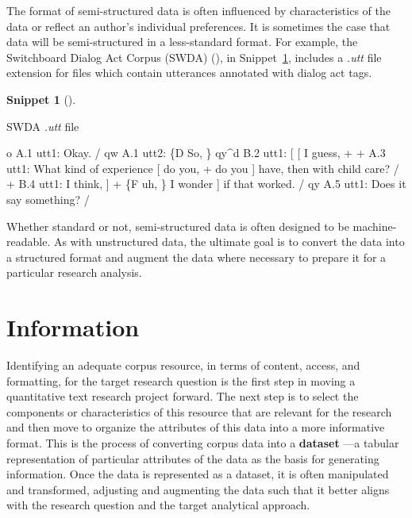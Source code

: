 \documentclass[
  letterpaper,
  krantz1]{latex/krantz-mod}
\newenvironment{Shaded}{\begin{snugshade}}{\end{snugshade}}
\newcommand{\NormalTok}[1]{\textcolor[rgb]{0.00,0.00,0.00}{#1}}
\theoremstyle{definition}
\newtheorem{definition}{Snippet}[chapter]
\theoremstyle{definition}
\theoremstyle{remark}
\begin{document}
The format of semi-structured data is often influenced by
characteristics of the data or reflect an author's individual
preferences. It is sometimes the case that data will be semi-structured
in a less-standard format. For example, the Switchboard Dialog Act
Corpus (SWDA)
(), in
Snippet~\ref{def-swda-utt}, includes a \emph{.utt} file extension for
files which contain utterances annotated with dialog act
tags.

\pagebreak

\begin{definition}[]\protect\hypertarget{def-swda-utt}{}\label{def-swda-utt}

SWDA \emph{.utt} file

\begin{Shaded}
\begin{Highlighting}[]
\NormalTok{o      A.1 utt1: Okay. /}
\NormalTok{qw     A.1 utt2: \{D So, \}}
\NormalTok{qy\^{}d   B.2 utt1: [ [ I guess, +}
\NormalTok{+      A.3 utt1: What kind of experience [ do you, + do you ] have, then with child care? /}
\NormalTok{+      B.4 utt1: I think, ] + \{F uh, \} I wonder ] if that worked. /}
\NormalTok{qy     A.5 utt1: Does it say something? /}
\end{Highlighting}
\end{Shaded}

\end{definition}

Whether standard or not, semi-structured data is often designed to be
machine-readable. As with unstructured data, the ultimate goal is to
convert the data into a structured format and augment the data where
necessary to prepare it for a particular research analysis.

\section{Information}\label{information}

Identifying an adequate corpus resource, in terms of content, access,
and formatting, for the target research
question is the first step in moving a
quantitative text research project forward. The next step is to select
the components or characteristics of this resource that are relevant for
the research and then move to organize the attributes of
this data into a more informative format. This is
the process of converting corpus data into a
\textbf{dataset} ---a tabular representation of
particular attributes of the data as the basis for generating
information. Once the data is represented as a dataset, it is often
manipulated and transformed, adjusting and augmenting the data such that
it better aligns with the research question and the target analytical
approach.
\end{document}
